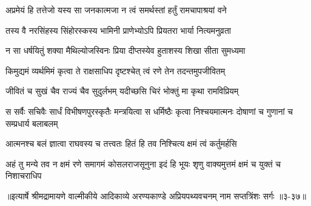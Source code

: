 \twolineshloka
{अप्रमेयं हि तत्तेजो यस्य सा जनकात्मजा}
{न त्वं समर्थस्तां हर्तुं रामचापाश्रयां वने} %

\twolineshloka
{तस्य वै नरसिंहस्य सिंहोरस्कस्य भामिनी}
{प्राणेभ्योऽपि प्रियतरा भार्या नित्यमनुव्रता} %

\twolineshloka
{न सा धर्षयितुं शक्या मैथिल्योजस्विनः प्रिया}
{दीप्तस्येव हुताशस्य शिखा सीता सुमध्यमा} %

\twolineshloka
{किमुद्यमं व्यर्थमिमं कृत्वा ते राक्षसाधिप}
{दृष्टश्चेत् त्वं रणे तेन तदन्तमुपजीवितम्} %

\twolineshloka
{जीवितं च सुखं चैव राज्यं चैव सुदुर्लभम्}
{यदीच्छसि चिरं भोक्तुं मा कृथा रामविप्रियम्} %

\threelineshloka
{स सर्वैः सचिवैः सार्धं विभीषणपुरस्कृतैः}
{मन्त्रयित्वा स धर्मिष्ठैः कृत्वा निश्चयमात्मनः}
{दोषाणां च गुणानां च सम्प्रधार्य बलाबलम्} %

\twolineshloka
{आत्मनश्च बलं ज्ञात्वा राघवस्य च तत्त्वतः}
{हितं हि तव निश्चित्य क्षमं त्वं कर्तुमर्हसि} %

\twolineshloka
{अहं तु मन्ये तव न क्षमं रणे समागमं कोसलराजसूनुना}
{इदं हि भूयः शृणु वाक्यमुत्तमं क्षमं च युक्तं च निशाचराधिप} %


॥इत्यार्षे श्रीमद्रामायणे वाल्मीकीये आदिकाव्ये अरण्यकाण्डे अप्रियपथ्यवचनम् नाम सप्तत्रिंशः सर्गः ॥३-३७॥
